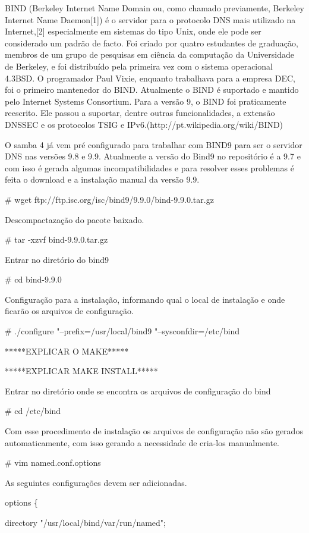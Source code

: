 BIND (Berkeley Internet Name Domain ou, como chamado previamente, Berkeley Internet Name Daemon[1]) é o servidor para o protocolo DNS mais utilizado na Internet,[2] especialmente em sistemas do tipo Unix, onde ele pode ser considerado um padrão de facto. Foi criado por quatro estudantes de graduação, membros de um grupo de pesquisas em ciência da computação da Universidade de Berkeley, e foi distribuído pela primeira vez com o sistema operacional 4.3BSD. O programador Paul Vixie, enquanto trabalhava para a empresa DEC, foi o primeiro mantenedor do BIND. Atualmente o BIND é suportado e mantido pelo Internet Systems Consortium.
Para a versão 9, o BIND foi praticamente reescrito. Ele passou a suportar, dentre outras funcionalidades, a extensão DNSSEC e os protocolos TSIG e IPv6.(http://pt.wikipedia.org/wiki/BIND)

O samba 4 já vem pré configurado para trabalhar com BIND9 para ser o servidor DNS nas versões 9.8 e 9.9.
Atualmente a versão do Bind9 no repositório é a 9.7 e com isso é gerada algumas incompatibilidades e para resolver esses problemas é feita o download e a  instalação manual da versão 9.9.

\# wget ftp://ftp.isc.org/isc/bind9/9.9.0/bind-9.9.0.tar.gz

Descompactazação do pacote baixado.
 
\# tar -xzvf bind-9.9.0.tar.gz

Entrar no diretório do bind9

\# cd bind-9.9.0

Configuração para a instalação, informando qual o local de instalação e onde ficarão os arquivos de configuração.

\# ./configure "--prefix=/usr/local/bind9 "--sysconfdir=/etc/bind

*****EXPLICAR O MAKE*****

*****EXPLICAR MAKE INSTALL*****

Entrar no diretório onde se encontra os arquivos de configuração do bind

\# cd /etc/bind

Com esse procedimento de instalação os arquivos de configuração não são gerados automaticamente, com isso gerando a necessidade de cria-los manualmente.

\# vim named.conf.options

As seguintes configurações devem ser adicionadas.

options \{
	
directory "/usr/local/bind/var/run/named";

